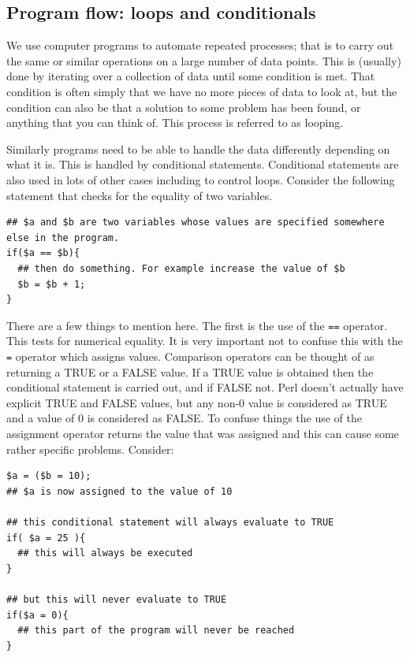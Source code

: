 \documentclass[11pt]{article}
\begin{document}
\subsection{Program flow: loops and conditionals}
\label{sec-5-4}

We use computer programs to automate repeated processes; that is to
carry out the same or similar operations on a large number of data
points. This is (usually) done by iterating over a collection of data
until some condition is met. That condition is often simply that we have
no more pieces of data to look at, but the condition can also be that a
solution to some problem has been found, or anything that you can think
of. This process is referred to as looping.

Similarly programs need to be able to handle the data differently
depending on what it is. This is handled by conditional statements.
Conditional statements are also used in lots of other cases including to
control loops. Consider the following statement that checks for the
equality of two variables.

\begin{verbatim}
## $a and $b are two variables whose values are specified somewhere else in the program.
if($a == $b){
  ## then do something. For example increase the value of $b
  $b = $b + 1;
}
\end{verbatim}

There are a few things to mention here. The first is the use of the \texttt{==}
operator. This tests for numerical equality. It is very important not to
confuse this with the \texttt{=} operator which assigns values. Comparison
operators can be thought of as returning a TRUE or a FALSE value. If a
TRUE value is obtained then the conditional statement is carried out,
and if FALSE not. Perl doesn't actually have explicit TRUE and FALSE
values, but any non-0 value is considered as TRUE and a value of 0 is
considered as FALSE. To confuse things the use of the assignment
operator returns the value that was assigned and this can cause some
rather specific problems. Consider:

\begin{verbatim}
$a = ($b = 10);
## $a is now assigned to the value of 10

## this conditional statement will always evaluate to TRUE
if( $a = 25 ){
  ## this will always be executed
}

## but this will never evaluate to TRUE
if($a = 0){
  ## this part of the program will never be reached
}
\end{verbatim}
\end{document}
